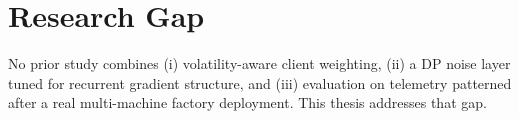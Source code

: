 \section{Research Gap}
\begin{tcolorbox}[infobox,title=Positioning of This Work]
No prior study combines (i) volatility-aware client weighting, (ii) a DP noise layer
tuned for recurrent gradient structure, and (iii) evaluation on telemetry patterned
after a real multi-machine factory deployment. This thesis addresses that gap.
\end{tcolorbox}
